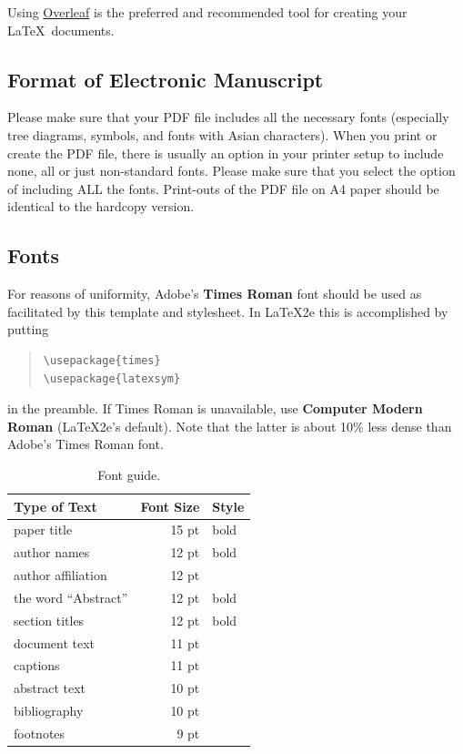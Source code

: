\documentclass[11pt,table,xcdraw]{article}
\begin{document}
Using \href{http://www.overleaf.com}{Overleaf} is the preferred and recommended tool for creating your \LaTeX\ documents.


\subsection{Format of Electronic Manuscript}
\label{sect:pdf}

Please make sure that your PDF file includes all the necessary fonts (especially tree diagrams, symbols, and fonts with Asian characters). When you print or create the PDF file, there is usually
an option in your printer setup to include none, all or just non-standard fonts.  Please make sure that you select the option of including ALL the fonts. Print-outs of the PDF file on A4 paper should be identical to the hardcopy version. 


\subsection{Fonts}

For reasons of uniformity, Adobe's {\bf Times Roman} font should be used as facilitated by this template and stylesheet. In \LaTeX2e{} this is accomplished by putting

\begin{quote}
\begin{verbatim}
\usepackage{times}
\usepackage{latexsym}
\end{verbatim}
\end{quote}
in the preamble. If Times Roman is unavailable, use {\bf Computer
  Modern Roman} (\LaTeX2e{}'s default).  Note that the latter is about
  10\% less dense than Adobe's Times Roman font.


\begin{table}[h]
\begin{center}
\begin{tabular}{|l|r|l|}
\hline \bf Type of Text & \bf Font Size & \bf Style \\ \hline
paper title & 15 pt & bold \\
author names & 12 pt & bold \\
author affiliation & 12 pt & \\
the word ``Abstract'' & 12 pt & bold \\
section titles & 12 pt & bold \\
document text & 11 pt  &\\
captions & 11 pt & \\
abstract text & 10 pt & \\
bibliography & 10 pt & \\
footnotes & 9 pt & \\
\hline
\end{tabular}
\end{center}
\caption{\label{font-table} Font guide. }
\end{table}
\end{document}
